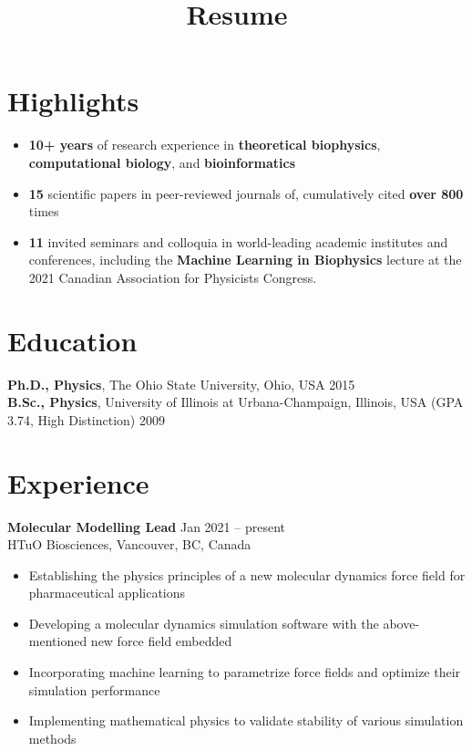 \documentclass[11pt]{../yhlcv}
\begin{document}
\title{Resume}

\maketitle

\raggedright

\section*{Highlights}

\begin{itemize}[leftmargin=*]\itemsep-0.2em
\item {\bf 10+ years} of research experience in {\bf theoretical biophysics}, {\bf computational biology}, and {\bf bioinformatics}
\item {\bf 15} scientific papers in peer-reviewed journals of, cumulatively cited {\bf over 800} times
\item {\bf 11} invited seminars and colloquia in world-leading academic institutes and conferences, including the {\bf Machine Learning in Biophysics} lecture at the 2021 Canadian Association for Physicists Congress.
\end{itemize}

\section*{Education}

{\bf Ph.D., Physics}, The Ohio State University, Ohio, USA \hfill 2015 \\
{\bf B.Sc., Physics}, University of Illinois at Urbana-Champaign, Illinois, USA (GPA 3.74, High Distinction) \hfill 2009

\section*{Experience}

{\bf Molecular Modelling Lead}  \hfill Jan 2021 -- present \vspace{0.25em} \\
HTuO Biosciences, Vancouver, BC, Canada 
\vspace{-0.7em} \\
\begin{itemize}[leftmargin=*]\itemsep-0.2em
\item Establishing the physics principles of a new molecular dynamics force field for pharmaceutical applications
\item Developing a molecular dynamics simulation software with the above-mentioned new force field embedded
\item Incorporating machine learning to parametrize force fields and optimize their simulation performance
\item Implementing mathematical physics to validate stability of various simulation methods
\end{itemize}
\end{document}
